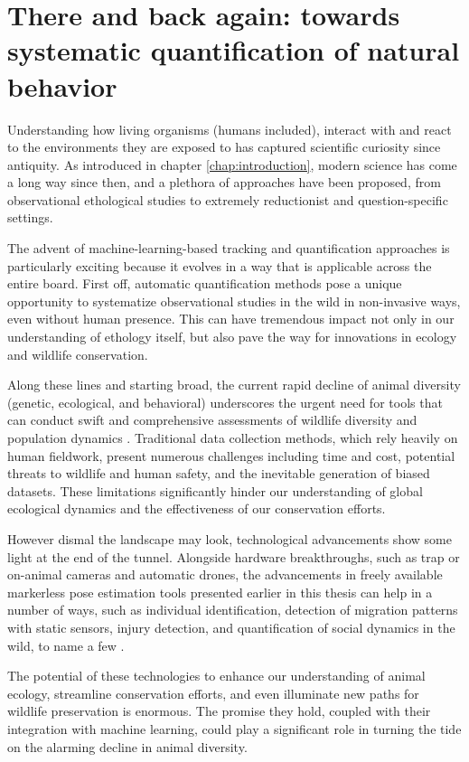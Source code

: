 \section{There and back again: towards systematic quantification of natural behavior}

Understanding how living organisms (humans included), interact with and react to the environments they are exposed to has captured scientific curiosity since antiquity. As introduced in chapter \ref{chap:introduction}, modern science has come a long way since then, and a plethora of approaches have been proposed, from observational ethological studies to extremely reductionist and question-specific settings.

The advent of machine-learning-based tracking and quantification approaches is particularly exciting because it evolves in a way that is applicable across the entire board. First off, automatic quantification methods pose a unique opportunity to systematize observational studies in the wild in non-invasive ways, even without human presence. This can have tremendous impact not only in our understanding of ethology itself, but also pave the way for innovations in ecology and wildlife conservation.

Along these lines and starting broad, the current rapid decline of animal diversity (genetic, ecological, and behavioral) underscores the urgent need for tools that can conduct swift and comprehensive assessments of wildlife diversity and population dynamics \cite{Ceballos2020VertebratesExtinction}. Traditional data collection methods, which rely heavily on human fieldwork, present numerous challenges including time and cost, potential threats to wildlife and human safety, and the inevitable generation of biased datasets. These limitations significantly hinder our understanding of global ecological dynamics and the effectiveness of our conservation efforts.

However dismal the landscape may look, technological advancements show some light at the end of the tunnel. Alongside hardware breakthroughs, such as trap or on-animal cameras and automatic drones, the advancements in freely available markerless pose estimation tools presented earlier in this thesis can help in a number of ways, such as individual identification, detection of migration patterns with static sensors, injury detection, and quantification of social dynamics in the wild, to name a few \cite{Tuia2022PerspectivesConservation}.

The potential of these technologies to enhance our understanding of animal ecology, streamline conservation efforts, and even illuminate new paths for wildlife preservation is enormous. The promise they hold, coupled with their integration with machine learning, could play a significant role in turning the tide on the alarming decline in animal diversity.

